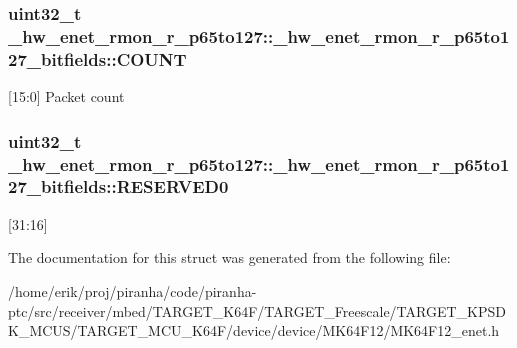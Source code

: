 \subsubsection[{\texorpdfstring{C\+O\+U\+NT}{COUNT}}]{\setlength{\rightskip}{0pt plus 5cm}uint32\+\_\+t \+\_\+hw\+\_\+enet\+\_\+rmon\+\_\+r\+\_\+p65to127\+::\+\_\+hw\+\_\+enet\+\_\+rmon\+\_\+r\+\_\+p65to127\+\_\+bitfields\+::\+C\+O\+U\+NT}\hypertarget{struct__hw__enet__rmon__r__p65to127_1_1__hw__enet__rmon__r__p65to127__bitfields_ab9c34d9e88d65344ad7b177787c446fd}{}\label{struct__hw__enet__rmon__r__p65to127_1_1__hw__enet__rmon__r__p65to127__bitfields_ab9c34d9e88d65344ad7b177787c446fd}
\mbox{[}15\+:0\mbox{]} Packet count 
\subsubsection[{\texorpdfstring{R\+E\+S\+E\+R\+V\+E\+D0}{RESERVED0}}]{\setlength{\rightskip}{0pt plus 5cm}uint32\+\_\+t \+\_\+hw\+\_\+enet\+\_\+rmon\+\_\+r\+\_\+p65to127\+::\+\_\+hw\+\_\+enet\+\_\+rmon\+\_\+r\+\_\+p65to127\+\_\+bitfields\+::\+R\+E\+S\+E\+R\+V\+E\+D0}\hypertarget{struct__hw__enet__rmon__r__p65to127_1_1__hw__enet__rmon__r__p65to127__bitfields_a92c70bbdba4bcf0bc809bd1a26ccd177}{}\label{struct__hw__enet__rmon__r__p65to127_1_1__hw__enet__rmon__r__p65to127__bitfields_a92c70bbdba4bcf0bc809bd1a26ccd177}
\mbox{[}31\+:16\mbox{]} 

The documentation for this struct was generated from the following file\+:\begin{DoxyCompactItemize}
\item 
/home/erik/proj/piranha/code/piranha-\/ptc/src/receiver/mbed/\+T\+A\+R\+G\+E\+T\+\_\+\+K64\+F/\+T\+A\+R\+G\+E\+T\+\_\+\+Freescale/\+T\+A\+R\+G\+E\+T\+\_\+\+K\+P\+S\+D\+K\+\_\+\+M\+C\+U\+S/\+T\+A\+R\+G\+E\+T\+\_\+\+M\+C\+U\+\_\+\+K64\+F/device/device/\+M\+K64\+F12/M\+K64\+F12\+\_\+enet.\+h\end{DoxyCompactItemize}
